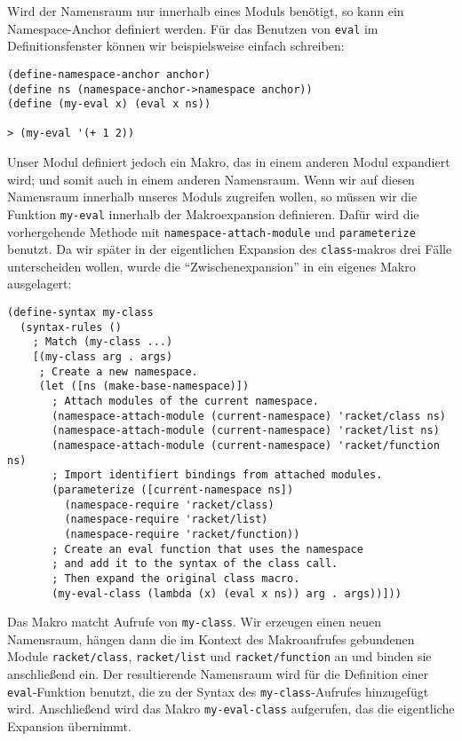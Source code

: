 Wird der Namensraum nur innerhalb eines Moduls benötigt, so kann ein Name\-space-An\-chor definiert werden. Für das Benutzen von \texttt{eval} im Definitionsfenster können wir beispielsweise einfach schreiben:

\begin{lstlisting}
(define-namespace-anchor anchor)
(define ns (namespace-anchor->namespace anchor))
(define (my-eval x) (eval x ns))

> (my-eval '(+ 1 2))
\end{lstlisting}
{}

Unser Modul definiert jedoch ein Makro, das in einem anderen Modul expandiert wird; und somit auch in einem anderen Namensraum. Wenn wir auf diesen Namensraum innerhalb unseres Moduls zugreifen wollen, so müssen wir die Funktion \texttt{my-eval} innerhalb der Makroexpansion definieren. Dafür wird die vorhergehende Methode mit \texttt{namespace-attach-module} und \texttt{parameterize} benutzt. Da wir später in der eigentlichen Expansion des \texttt{class}-makros drei Fälle unterscheiden wollen, wurde die ``Zwischenexpansion'' in ein eigenes Makro ausgelagert:

\begin{lstlisting}
(define-syntax my-class
  (syntax-rules ()
    ; Match (my-class ...)
    [(my-class arg . args)
     ; Create a new namespace.
     (let ([ns (make-base-namespace)])
       ; Attach modules of the current namespace.
       (namespace-attach-module (current-namespace) 'racket/class ns)
       (namespace-attach-module (current-namespace) 'racket/list ns)
       (namespace-attach-module (current-namespace) 'racket/function ns)
       ; Import identifiert bindings from attached modules.
       (parameterize ([current-namespace ns])
         (namespace-require 'racket/class)
         (namespace-require 'racket/list)
         (namespace-require 'racket/function))
       ; Create an eval function that uses the namespace
       ; and add it to the syntax of the class call.
       ; Then expand the original class macro.
       (my-eval-class (lambda (x) (eval x ns)) arg . args))]))
\end{lstlisting}

Das Makro matcht Aufrufe von \texttt{my-class}. Wir erzeugen einen neuen Namensraum, hängen dann die im Kontext des Makroaufrufes gebundenen Module \texttt{racket/class}, \texttt{racket/list} und \texttt{racket/function} an und binden sie anschließend ein. Der resultierende Namensraum wird für die Definition einer \texttt{eval}-Funktion benutzt, die zu der Syntax des \texttt{my-class}-Aufrufes hinzugefügt wird. Anschließend wird das Makro \texttt{my-eval-class} aufgerufen, das die eigentliche Expansion übernimmt.

